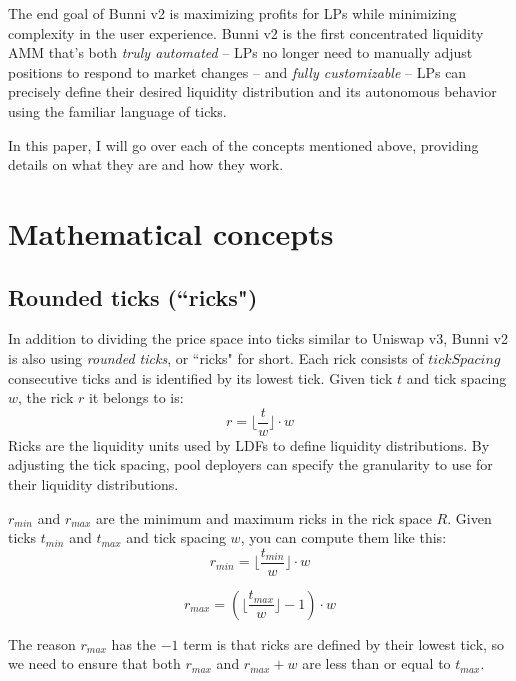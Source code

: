 \documentclass[twocolumn]{article}
\begin{document}
The end goal of Bunni v2 is maximizing profits for LPs while minimizing complexity in the user experience. Bunni v2 is the first concentrated liquidity AMM that's both \textit{truly automated} – LPs no longer need to manually adjust positions to respond to market changes – and \textit{fully customizable} – LPs can precisely define their desired liquidity distribution and its autonomous behavior using the familiar language of ticks.

In this paper, I will go over each of the concepts mentioned above, providing details on what they are and how they work.

\section{Mathematical concepts}

\subsection{Rounded ticks (``ricks")}

In addition to dividing the price space into ticks similar to Uniswap v3, Bunni v2 is also using \textit{rounded ticks}, or ``ricks" for short. Each rick consists of $tickSpacing$ consecutive ticks and is identified by its lowest tick. Given tick $t$ and tick spacing $w$, the rick $r$ it belongs to is:
\begin{equation}
  r = \lfloor \frac{t}{w} \rfloor \cdot w  
\end{equation}
Ricks are the liquidity units used by LDFs to define liquidity distributions. By adjusting the tick spacing, pool deployers can specify the granularity to use for their liquidity distributions.

$r_{min}$ and $r_{max}$ are the minimum and maximum ricks in the rick space $R$. Given ticks $t_{min}$ and $t_{max}$ and tick spacing $w$, you can compute them like this:
\begin{equation}
  r_{min} = \lfloor \frac{t_{min}}{w} \rfloor \cdot w
\end{equation}

\begin{equation}
  r_{max} = (\lfloor \frac{t_{max}}{w} \rfloor - 1) \cdot w
\end{equation}

The reason $r_{max}$ has the $-1$ term is that ricks are defined by their lowest tick, so we need to ensure that both $r_{max}$ and $r_{max} + w$ are less than or equal to $t_{max}$.  
\end{document}
